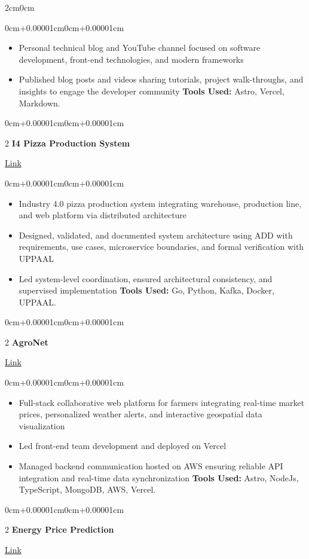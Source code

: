 \documentclass[10pt, a4paper]{article}
\newenvironment{highlights}{
    \begin{itemize}[
        topsep=0.08cm, parsep=0.08cm, partopsep=0pt,
        itemsep=0pt, leftmargin=0cm+10pt
    ]
}{
    \end{itemize}
}
\newenvironment{onecolentry}{
    \begin{adjustwidth}{0cm+0.00001cm}{0cm+0.00001cm}
}{
    \end{adjustwidth}
}
\newenvironment{twocolentry}[2][]{
    \onecolentry
    \def\secondColumn{#2}
    \setcolumnwidth{\fill, 4.5cm}
    \begin{paracol}{2}
}{
    \switchcolumn\raggedleft\small\color{mutedText}\secondColumn
    \end{paracol}
    \endonecolentry
}
\begin{document}
\begin{adjustwidth}{2cm}{0cm}
\vspace{0.10 cm}
\begin{onecolentry}
\begin{highlights}
\item Personal technical blog and YouTube channel focused on software development, front-end technologies, and modern frameworks
\item Published blog posts and videos sharing tutorials, project walk-throughs, and insights to engage the developer community \textbf{Tools Used:} Astro, Vercel, Markdown.
\end{highlights}
\end{onecolentry}
\vspace{0.10 cm}
\begin{twocolentry}{\href{github.com/The-European-Avengers/pizza-i4-architecture-group2}{Link}}\textbf{I4 Pizza Production System}
\end{twocolentry}

\vspace{0.10 cm}
\begin{onecolentry}
\begin{highlights}
\item Industry 4.0 pizza production system integrating warehouse, production line, and web platform via distributed architecture
\item Designed, validated, and documented system architecture using ADD with requirements, use cases, microservice boundaries, and formal verification with UPPAAL
\item Led system-level coordination, ensured architectural consistency, and supervised implementation \textbf{Tools Used:} Go, Python, Kafka, Docker, UPPAAL.
\end{highlights}
\end{onecolentry}
\vspace{0.10 cm}
\begin{twocolentry}{\href{github.com/STW-24-25}{Link}}\textbf{AgroNet}
\end{twocolentry}

\vspace{0.10 cm}
\begin{onecolentry}
\begin{highlights}
\item Full-stack collaborative web platform for farmers integrating real-time market prices, personalized weather alerts, and interactive geospatial data visualization
\item Led front-end team development and deployed on Vercel
\item Managed backend communication hosted on AWS ensuring reliable API integration and real-time data synchronization \textbf{Tools Used:} Astro, NodeJs, TypeScript, MongoDB, AWS, Vercel.
\end{highlights}
\end{onecolentry}
\vspace{0.10 cm}
\begin{twocolentry}{\href{github.com/The-European-Avengers/BigDataProject}{Link}}\textbf{Energy Price Prediction}
\end{twocolentry}


\end{adjustwidth}
\end{document}
